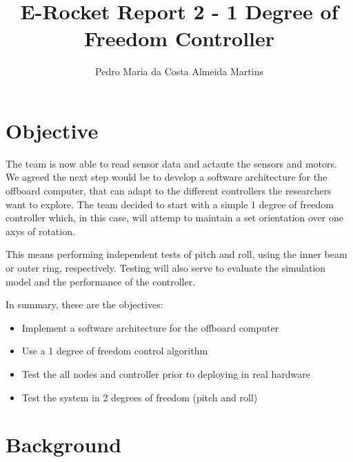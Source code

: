 \documentclass[a4paper]{article}
\begin{document}
\title{E-Rocket Report 2 - 1 Degree of Freedom Controller}
\author{Pedro Maria da Costa Almeida Martins}

\maketitle
\thispagestyle{empty}
\clearpage


\tableofcontents
\thispagestyle{empty}
\clearpage



\section{Objective}

The team is now able to read sensor data and actaute the sensors and motors. 
We agreed the next step would be to develop a software architecture for the offboard computer, that can adapt to the different controllers the researchers want to explore. 
The team decided to start with a simple 1 degree of freedom controller which, in this case, will attemp to maintain a set orientation over one axys of rotation. 

This means performing independent tests of pitch and roll, using the inner beam or outer ring, respectively. 
Testing will also serve to evaluate the simulation model and the performance of the controller. 

In summary, these are the objectives: 

\begin{itemize}
    \item Implement a software architecture for the offboard computer 
    \item Use a 1 degree of freedom control algorithm 
    \item Test the all nodes and controller prior to deploying in real hardware
    \item Test the system in 2 degrees of freedom (pitch and roll)
\end{itemize}


\clearpage
\label{sec::background}
\section{Background}
\end{document}
